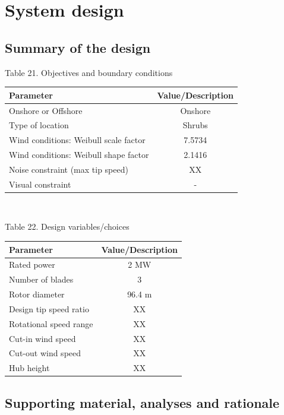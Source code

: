 \section{System design}

\subsection{Summary of the design}


\begin{center}
Table 21. Objectives and boundary conditions\\
\begin{tabular}{ |l|c| } 
\hline
\textbf{Parameter} & \textbf{Value/Description}  \\ 
\hline
Onshore or Offshore & Onshore  \\ 
\hline
Type of location & Shrubs \\ 
\hline
Wind conditions: Weibull scale factor & 7.5734 \\
\hline
Wind conditions: Weibull shape factor & 2.1416 \\
\hline
Noise constraint (max tip speed) & XX \\
\hline
Visual constraint & - \\
\hline
\end{tabular} \\
\end{center}

\begin{center}
Table 22. Design variables/choices\\
\begin{tabular}{ |l|c| } 
\hline
\textbf{Parameter} & \textbf{Value/Description}  \\ 
\hline
Rated power & 2 MW  \\ 
\hline
Number of blades & 3 \\ 
\hline
Rotor diameter & 96.4 m \\
\hline
Design tip speed ratio & XX \\
\hline
Rotational speed range & XX \\
\hline
Cut-in wind speed & XX \\
\hline
Cut-out wind speed & XX \\
\hline
Hub height & XX \\
\hline
\end{tabular}
\end{center}

\subsection{Supporting material, analyses and rationale}

